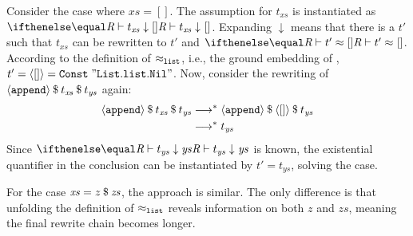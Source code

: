 Consider the case where $\mathit{xs} = []$.
The assumption for $t_\mathit{xs}$ is instantiated as $\evalr\R{t_\mathit{xs}}{[]}$.
Expanding $\downarrow$ means that there is a $t'$ such that $t_\mathit{xs}$ can be rewritten to $t'$ and $\eval\R{t'}{[]}$.
According to the definition of $\approx_{\texttt{\textup{list}}}$, i.e., the ground embedding of , $t' = \left\langle[]\right\rangle = \texttt{\textup{Const}}\;\mathtt{"List.list.Nil"}$.
Now, consider the rewriting of $\left\langle\texttt{\textup{append}}\right\rangle\mathbin{\$}t_{\mathit{xs}}\mathbin{\$}t_{\mathit{ys}}$ again:
%
\begin{align*}
  \left\langle\texttt{\textup{append}}\right\rangle\mathbin{\$}t_{\mathit{xs}}\mathbin{\$}t_{\mathit{ys}} &\longrightarrow^* \left\langle\texttt{\textup{append}}\right\rangle\mathbin{\$}\left\langle[]\right\rangle\mathbin{\$}t_{\mathit{ys}} \\
  &\longrightarrow^* t_{\mathit{ys}}
\end{align*}
%
Since $\evalr\R{t_\mathit{ys}}{\mathit{ys}}$ is known, the existential quantifier in the conclusion can be instantiated by $t' = t_\mathit{ys}$, solving the case.

For the case $\mathit{xs} = z\mathbin{\$}\mathit{zs}$, the approach is similar.
The only difference is that unfolding the definition of $\approx_{\texttt{\textup{list}}}$ reveals information on both $z$ and $\mathit{zs}$, meaning the final rewrite chain becomes longer.